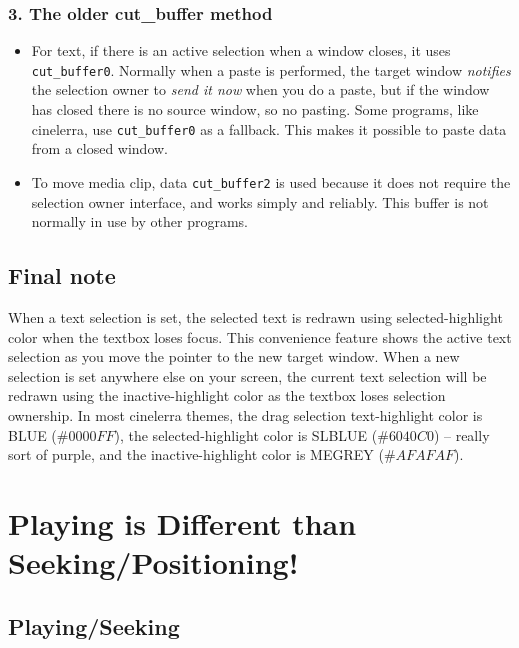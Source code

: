 \subsubsection*{3. The older cut\_buffer method}%
\label{ssub:older_cut_buffer_method}

\begin{itemize}
    \item For text, if there is an active selection when a window closes, it uses \texttt{cut\_buffer0}.  Normally when a paste is performed, the target window \textit{notifies} the selection owner to \textit{send it now} when you do a paste, but if the window has closed there is no source window, so no pasting.  Some programs, like cinelerra, use \texttt{cut\_buffer0} as a fallback.  This makes it possible to paste data from a closed window.
    \item To move media clip, data \texttt{cut\_buffer2} is used because it does not require the selection owner interface, and works simply and reliably.  This buffer is not normally in use by other programs.
\end{itemize}

\subsection*{Final note}%
\label{sub:final_note}

When a text selection is set, the selected text is redrawn using selected-highlight color when the textbox loses focus.  This convenience feature shows the active text selection as you move the pointer to the new target window.  When a new selection is set anywhere else on your screen, the current text selection will be redrawn using the inactive-highlight color as the textbox loses selection ownership.  In most cinelerra themes, the drag selection text-highlight color is BLUE ($\#0000FF$), the selected-highlight color is SLBLUE ($\#6040C0$) -- really sort of purple, and the inactive-highlight color is MEGREY ($\#AFAFAF$).

\section{Playing is Different than Seeking/Positioning!}%
\label{sec:playing_seeking_positioning}

\subsection{Playing/Seeking}%
\label{sub:playing_seeking}

